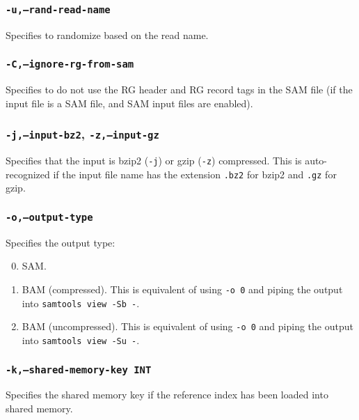 \documentclass[a4paper,12pt]{book}
\newcommand{\TT}[1]{{\tt #1}} %
\begin{document}
\subsubsection{\TT{-u,--rand-read-name}}
Specifies to randomize based on the read name.

\subsubsection{\TT{-C,--ignore-rg-from-sam}}
Specifies to do not use the RG header and RG record tags in the SAM file (if the input file is a SAM file, and SAM input files are enabled).

\subsubsection{\TT{-j,--input-bz2}, \TT{-z,--input-gz}}
Specifies that the input is bzip2 (\TT{-j}) or gzip (\TT{-z}) compressed.
This is auto-recognized if the input file name has the extension \TT{.bz2} for bzip2 and \TT{.gz} for gzip.

\subsubsection{\TT{-o,--output-type}}
Specifies the output type:
\begin{enumerate}
	\setcounter{enumi}{-1} %
	\item SAM.
	\item BAM (compressed). This is equivalent of using \TT{-o 0} and piping the output into \TT{samtools view -Sb -}.
	\item BAM (uncompressed). This is equivalent of using \TT{-o 0} and piping the output into \TT{samtools view -Su -}.
\end{enumerate}

\subsubsection{\TT{-k,--shared-memory-key INT}}
Specifies the shared memory key if the reference index has been loaded into shared memory.
\end{document}
